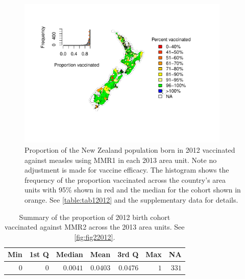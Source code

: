 \documentclass{article}
\begin{document}
\begin{figure}
\begin{center}
    \includegraphics[width=0.9\textwidth]{nir_census_MMR1_NIR_2012.pdf}
 \end{center}
    \caption{Proportion of the New Zealand population born in 2012 vaccinated against measles using MMR1 in each 2013 area unit. Note no adjustment is made for vaccine efficacy. The histogram shows the frequency of the proportion vaccinated across the country's area units with 95\% shown in red and the median for the cohort shown in orange. See \autoref{table:tab12012} and the supplementary data for details.}
\label{fig:fig12012}
\end{figure}

 \vspace{5mm} %
\begin{table}
\begin{center}
\begin{tabular}{rrrrrrr}
\hline\hline
\multicolumn{1}{c}{Min}&\multicolumn{1}{c}{1st Q}&\multicolumn{1}{c}{Median}&\multicolumn{1}{c}{Mean}&\multicolumn{1}{c}{3rd Q}&\multicolumn{1}{c}{Max}&\multicolumn{1}{c}{NA}\tabularnewline
\hline
$0$&$0$&$0.0041$&$0.0403$&$0.0476$&$1$&$331$\tabularnewline
\hline
\end{tabular}\end{center}\caption{Summary of the proportion of 2012 birth cohort vaccinated against MMR2 across the 2013 area units. See \autoref{fig:fig22012}.}
\label{table:tab22012}
\end{table}
\end{document}

